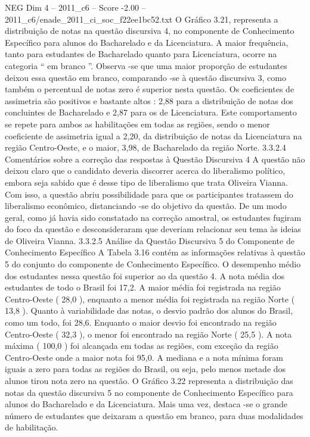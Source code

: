 \begin{textsample}{NEG Dim 4 – 2011\_c6 – Score -2.00 – 2011\_c6/enade\_2011\_ci\_soc\_f22ee1bc52.txt}
O Gráfico 3.21, representa a distribuição de notas na questão discursiva 4, no componente de Conhecimento Específico para alunos do Bacharelado e da Licenciatura.
A maior frequência, tanto para estudantes de Bacharelado quanto para Licenciatura, ocorre na categoria “ em branco ”.
Observa -se que uma maior proporção de estudantes deixou essa questão em branco, comparando -se à questão discursiva 3, como também o percentual de notas zero é superior nesta questão.
Os coeficientes de assimetria são positivos e bastante altos : 2,88 para a distribuição de notas dos concluintes de Bacharelado e 2,87 para os de Licenciatura.
Este comportamento se repete para ambos as habilitações em todas as regiões, sendo o menor coeficiente de assimetria igual a 2,20, da distribuição de notas da Licenciatura na região Centro-Oeste, e o maior, 3,98, de Bacharelado da região Norte. 3.3.2.4 Comentários sobre a correção das respostas à Questão Discursiva 4 A questão não deixou claro que o candidato deveria discorrer acerca do liberalismo político, embora seja sabido que é desse tipo de liberalismo que trata Oliveira Vianna.
Com isso, a questão abriu possibilidade para que os participantes tratassem do liberalismo econômico, distanciando -se do objetivo da questão.
De um modo geral, como já havia sido constatado na correção amostral, os estudantes fugiram do foco da questão e desconsideraram que deveriam relacionar seu tema às ideias de Oliveira Vianna. 3.3.2.5 Análise da Questão Discursiva 5 do Componente de Conhecimento Específico A Tabela 3.16 contém as informações relativas à questão 5 do conjunto do componente de Conhecimento Específico.
O desempenho médio dos estudantes nessa questão foi superior ao da questão 4.
A nota média dos estudantes de todo o Brasil foi 17,2.
A maior média foi registrada na região Centro-Oeste ( 28,0 ), enquanto a menor média foi registrada na região Norte ( 13,8 ).
Quanto à variabilidade das notas, o desvio padrão dos alunos do Brasil, como um todo, foi 28,6.
Enquanto o maior desvio foi encontrado na região Centro-Oeste ( 32,3 ), o menor foi encontrado na região Norte ( 25,5 ).
A nota máxima ( 100,0 ) foi alcançada em todas as regiões, com exceção da região Centro-Oeste onde a maior nota foi 95,0.
A mediana e a nota mínima foram iguais a zero para todas as regiões do Brasil, ou seja, pelo menos metade dos alunos tirou nota zero na questão.
O Gráfico 3.22 representa a distribuição das notas da questão discursiva 5 no componente de Conhecimento Específico para alunos do Bacharelado e da Licenciatura.
Mais uma vez, destaca -se o grande número de estudantes que deixaram a questão em branco, para duas modalidades de habilitação.

\end{textsample}
